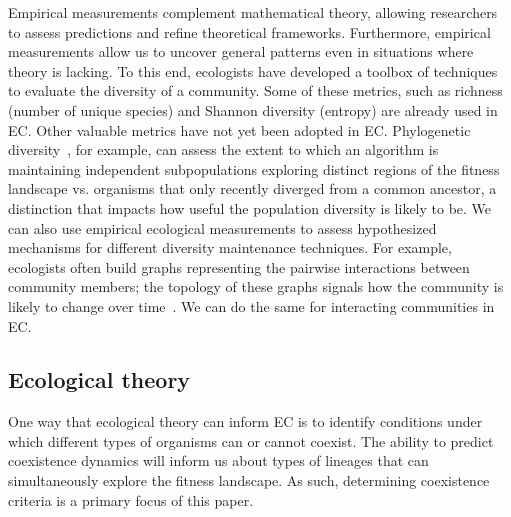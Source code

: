 Empirical measurements complement mathematical theory, allowing researchers to assess predictions and refine theoretical frameworks. Furthermore, empirical measurements allow us to uncover general patterns even in situations where theory is lacking. To this end, ecologists have developed a toolbox of techniques to evaluate the diversity of a community. Some of these metrics, such as richness (number of unique species) and Shannon diversity (entropy) are already used in EC. Other valuable metrics have not yet been adopted in EC. Phylogenetic diversity~\cite{winter_phylogenetic_2013}, for example, can assess the extent to which an algorithm is maintaining independent subpopulations exploring distinct regions of the fitness landscape vs. organisms that only recently diverged from a common ancestor, a distinction that impacts how useful the population diversity is likely to be. We can also use empirical ecological measurements to assess hypothesized mechanisms for different diversity maintenance techniques. For example, ecologists often build graphs representing the pairwise interactions between community members; the topology of these graphs signals how the community is likely to change over time~\cite{fontaine_ecological_2011}. We can do the same for interacting communities in EC.


\subsection{Ecological theory}

One way that ecological theory can inform EC is to identify conditions under which different types of organisms can or cannot coexist. The ability to predict coexistence dynamics will inform us about types of lineages that can simultaneously explore the fitness landscape. As such, determining coexistence criteria is a primary focus of this paper. %

